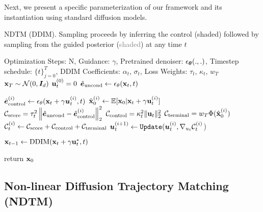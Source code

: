 Next, we present a specific parameterization of our framework and its instantiation using standard diffusion models.









\begin{algorithm}[tb]
\caption{NDTM (DDIM). Sampling proceeds by inferring the control (\textcolor{alt_algo}{shaded}) followed by sampling from the guided posterior (\textcolor{gray}{shaded}) at any time $t$}
\label{alg:ndtm_ddim}
\begin{algorithmic}[1]
 Optimization Steps: N, Guidance: $\gamma$, Pretrained denoiser: $\epsilon_{\bm{\theta}}(.,.)$, Timestep schedule: $\{t\}_{j=0}^T$, DDIM Coefficients: $\alpha_t$, $\sigma_t$, Loss Weights: $\tau_t$, $\kappa_t$, $w_T$
 ${\mathbf{x}}_T \sim \mathcal{N}(0, {\bm{I}}_d)$
    \STATE ${\mathbf{u}}_t^{(0)} = 0$
    \STATE $\hat{{\bm{e}}}_{\text{uncond}} \gets \epsilon_\theta({\mathbf{x}}_t, t)$
    \begin{tcolorbox}[algostyle3]
        \STATE $\hat{{\bm{e}}}_{\text{control}}^{(i)} \gets \epsilon_\theta({\mathbf{x}}_t + \gamma {\bm{u}}_t^{(i)}, t)$
        \STATE $\hat{{\mathbf{x}}}_0^{(i)} \gets \mathbb{E}[{\mathbf{x}}_0 | {\mathbf{x}}_t + \gamma {\mathbf{u}}_t^{(i)}]$
        \STATE ${\mathcal{C}}_\text{score} = \tau_t^2\left\| \hat{{\bm{e}}}_{\text{uncond}} - \hat{{\bm{e}}}_{\text{control}}^{(i)} \right\|_2^2$
        \STATE ${\mathcal{C}}_\text{control} = \kappa_t^2 \Vert {\mathbf{u}}_t \Vert_2^2$
        \STATE ${\mathcal{C}}_\text{terminal} = w_T\Phi(\hat{{\mathbf{x}}}_0^{(i)})$
        \STATE ${\mathcal{C}}_t^{(i)} \gets {\mathcal{C}}_\text{score} + {\mathcal{C}}_\text{control} + {\mathcal{C}}_\text{terminal}$
        \STATE ${\bm{u}}_t^{(i+1)} \gets \texttt{Update}({\bm{u}}_t^{(i)}, \nabla_{u_t} {\mathcal{C}}_t^{(i)}$)
    \ENDFOR
    \end{tcolorbox}
    \begin{tcolorbox}[algostyle]
        \STATE ${\mathbf{x}}_{t-1} \gets \text{DDIM}({\mathbf{x}}_t + \gamma {\mathbf{u}}_t^*, t)$
    \end{tcolorbox}
\ENDFOR
\STATE return ${\mathbf{x}}_0$
\end{algorithmic}
\end{algorithm}

\subsection{Non-linear Diffusion Trajectory Matching (NDTM)}
\label{sec:ndtm}

